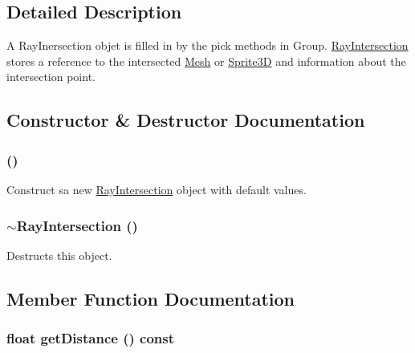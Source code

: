 \subsection{Detailed Description}
A RayInersection objet is filled in by the pick methods in Group. \hyperlink{classm3g_1_1RayIntersection}{RayIntersection} stores a reference to the intersected \hyperlink{classm3g_1_1Mesh}{Mesh} or \hyperlink{classm3g_1_1Sprite3D}{Sprite3D} and information about the intersection point. 

\subsection{Constructor \& Destructor Documentation}
\hypertarget{classm3g_1_1RayIntersection_242b33a79f98ed90ad5a36912d2a46d5}{
\subsubsection[{RayIntersection}]{ ()}}
\label{classm3g_1_1RayIntersection_242b33a79f98ed90ad5a36912d2a46d5}


Construct sa new \hyperlink{classm3g_1_1RayIntersection}{RayIntersection} object with default values. \hypertarget{classm3g_1_1RayIntersection_bf9eb45cc9ff31acd542bb0da1b46fe1}{
\subsubsection[{$\sim$RayIntersection}]{\setlength{\rightskip}{0pt plus 5cm}$\sim${\bf RayIntersection} ()}}
\label{classm3g_1_1RayIntersection_bf9eb45cc9ff31acd542bb0da1b46fe1}


Destructs this object. 

\subsection{Member Function Documentation}
\hypertarget{classm3g_1_1RayIntersection_f024301f51d2ef67cac50e3255a49612}{
\subsubsection[{getDistance}]{\setlength{\rightskip}{0pt plus 5cm}float getDistance () const}}
\label{classm3g_1_1RayIntersection_f024301f51d2ef67cac50e3255a49612}


